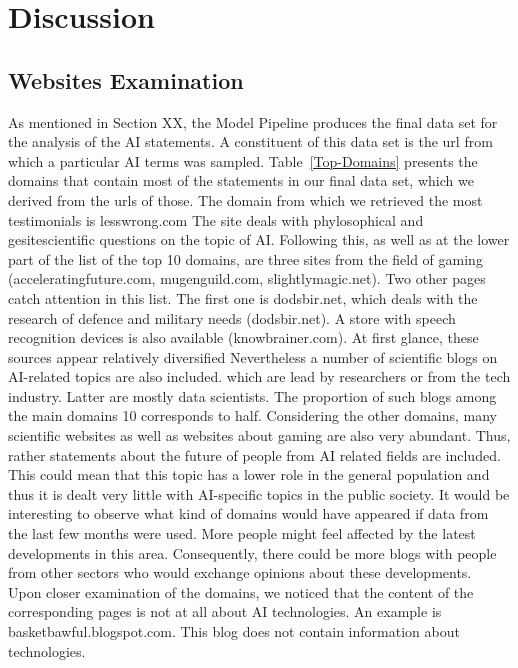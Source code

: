 \section{Discussion}

\subsection{Websites Examination}

As mentioned in Section XX, the Model Pipeline produces the final data set for the analysis of the AI statements. 
A constituent of this data set is the url from which a particular AI terms was sampled.
Table~\ref{Top-Domains} presents the domains that contain most of the statements in our final data set, which we derived from the urls of those.
The domain from which we retrieved the most testimonials is lesswrong.com
The site deals with phylosophical and gesitescientific questions on the topic of AI. 
Following this, as well as at the lower part of the list of the top 10 domains, are three sites from the field of gaming (acceleratingfuture.com, mugenguild.com, slightlymagic.net).
Two other pages catch attention in this list.
The first one is dodsbir.net, which deals with the research of defence and military needs (dodsbir.net).
A store with speech recognition devices is also available (knowbrainer.com).
At first glance, these sources appear relatively diversified
Nevertheless a number of scientific blogs on AI-related topics are also included. which are lead by researchers or from the tech industry.
Latter are mostly data scientists.
The proportion of such blogs among the main domains 10 corresponds to half.
Considering the other domains, many scientific websites as well as websites about gaming are also very abundant.
Thus, rather statements about the future of people from AI related fields are included.
This could mean that this topic has a lower role in the general population and thus it is dealt very little with AI-specific topics in the public society.
It would be interesting to observe what kind of domains would have appeared if data from the last few months were used.
More people might feel affected by the latest developments in this area.
Consequently, there could be more blogs with people from other sectors who would exchange opinions about these developments.
\\
Upon closer examination of the domains, we noticed that the content of the corresponding pages is not at all about AI technologies.
An example is basketbawful.blogspot.com. 
This blog does not contain information about technologies.
